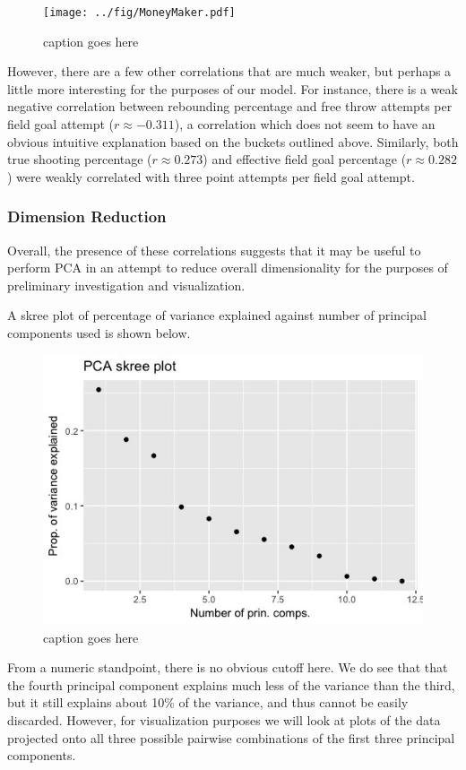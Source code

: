 \documentclass[10pt,a4paper, hidelinks]{article} %
\begin{document}
\begin{figure}[H]
	\centering
	\texttt{[image: ../fig/MoneyMaker.pdf]}
	\caption{caption goes here}
	\label{fig:ggpairs}
\end{figure} 

However, there are a few other correlations that are much weaker, but perhaps a little more interesting for the purposes of our model. For instance, there is a weak negative correlation between rebounding percentage and free throw attempts per field goal attempt ($r \approx -0.311$), a correlation which does not seem to have an obvious intuitive explanation based on the buckets outlined above. Similarly, both true shooting percentage ($r \approx 0.273$) and effective field goal percentage ($r \approx 0.282$) were weakly correlated with three point attempts per field goal attempt.

\subsubsection{Dimension Reduction}

Overall, the presence of these correlations suggests that it may be useful to perform PCA in an attempt to reduce overall dimensionality for the purposes of preliminary investigation and visualization.

A skree plot of percentage of variance explained against number of principal components used is shown below. 

\begin{figure}[H]
	\centering
	\includegraphics[width=0.7\linewidth]{../fig/Skreeeeee}
	\caption{caption goes here}
	\label{fig:Skreeeeee}
\end{figure}

From a numeric standpoint, there is no obvious cutoff here. We do see that that the fourth principal component explains much less of the variance than the third, but it still explains about 10\% of the variance, and thus cannot be easily discarded. However, for visualization purposes we will look at plots of the data projected onto all three possible pairwise combinations of the first three principal components.
\end{document}
